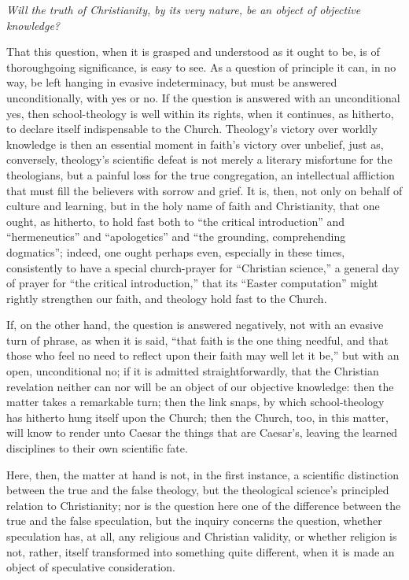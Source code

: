 \documentclass[12pt]{book}
\begin{document}
\begin{center}
\emph{Will the truth of Christianity, by its very nature, be an object of objective knowledge?}
\end{center}

That this question, when it is grasped and understood as it ought to be, is of thoroughgoing significance, is easy to see. As a question of principle it can, in no way, be left hanging in evasive indeterminacy,
but must be answered unconditionally, with yes or no. If the question is answered with an unconditional yes, then school-theology is well within its rights, when it continues, as hitherto, to declare itself indispensable to the Church. Theology's victory over worldly knowledge is then an essential moment in faith's victory over unbelief, just as, conversely, theology's scientific defeat is not merely a literary misfortune for the theologians, but a painful loss for the true congregation, an intellectual affliction that must fill the believers with sorrow and grief. It is, then, not only on behalf of culture and learning, but in the holy name of faith and Christianity, that one ought, as hitherto, to hold fast both to ``the critical introduction'' and ``hermeneutics'' and ``apologetics'' and ``the grounding, comprehending dogmatics''; indeed, one ought perhaps even, especially in these times, consistently to have a special church-prayer for ``Christian science,'' a general day of prayer for ``the critical introduction,'' that its ``Easter computation'' might rightly strengthen our faith, and theology hold fast to the Church.

If, on the other hand, the question is answered negatively, not with an evasive turn of phrase, as when it is said, ``that faith is the one thing needful, and that those who feel no need to reflect upon their faith may well let it be,'' but with an open, unconditional no; if it is admitted straightforwardly, that the Christian revelation neither can nor will be an object of our objective knowledge: then the matter takes a remarkable turn; then the link snaps, by which school-theology has hitherto hung itself
upon the Church; then the Church, too, in this matter, will know to render unto Caesar the things that are Caesar's, leaving the learned disciplines to their own scientific fate.

Here, then, the matter at hand is not, in the first instance, a scientific distinction between the true and the false theology, but the theological science's principled relation to Christianity; nor is the question here one of the difference between the true and the false speculation, but the inquiry concerns the question, whether speculation has, at all, any religious and Christian validity, or whether religion is not, rather, itself transformed into something quite different, when it is made an object of speculative consideration.
\end{document}
